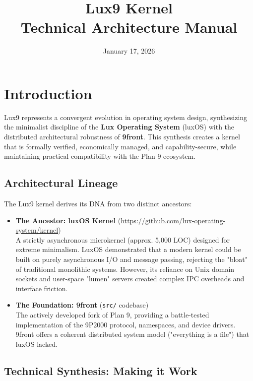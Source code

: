 \documentclass[11pt,letterpaper]{article}
\title{\textbf{Lux9 Kernel}\\Technical Architecture Manual}
\author{}
\date{January 17, 2026}
\begin{document}
\maketitle
\tableofcontents
\newpage

\section{Introduction}

Lux9 represents a convergent evolution in operating system design, synthesizing the minimalist discipline of the \textbf{Lux Operating System} (luxOS) with the distributed architectural robustness of \textbf{9front}. This synthesis creates a kernel that is formally verified, economically managed, and capability-secure, while maintaining practical compatibility with the Plan 9 ecosystem.

\subsection{Architectural Lineage}

The Lux9 kernel derives its DNA from two distinct ancestors:

\begin{itemize}
\item \textbf{The Ancestor: luxOS Kernel} (\url{https://github.com/lux-operating-system/kernel})\\
A strictly asynchronous microkernel (approx. 5,000 LOC) designed for extreme minimalism. LuxOS demonstrated that a modern kernel could be built on purely asynchronous I/O and message passing, rejecting the "bloat" of traditional monolithic systems. However, its reliance on Unix domain sockets and user-space "lumen" servers created complex IPC overheads and interface friction.

\item \textbf{The Foundation: 9front} (\texttt{src/} codebase)\\
The actively developed fork of Plan 9, providing a battle-tested implementation of the 9P2000 protocol, namespaces, and device drivers. 9front offers a coherent distributed system model ("everything is a file") that luxOS lacked.
\end{itemize}

\subsection{Technical Synthesis: Making it Work}
\end{document}
